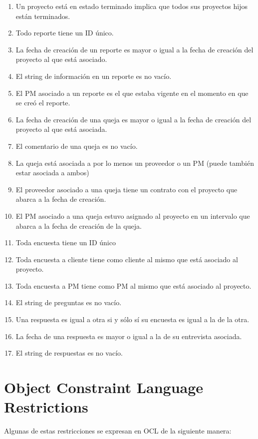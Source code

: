\documentclass{article}
\theoremstyle{definition}
\theoremstyle{remark}
\begin{document}
\begin{enumerate}
    \item Un proyecto está en estado terminado implica que todos sus proyectos hijos están terminados.
    \item Todo reporte tiene un ID único.
    \item La fecha de creación de un reporte es mayor o igual a la fecha de creación del proyecto al que está asociado.
    \item El string de información en un reporte es no vacío.
    \item El PM asociado a un reporte es el que estaba vigente en el momento en que se creó el reporte.
    \item La fecha de creación de una queja es mayor o igual a la fecha de creación del proyecto al que está asociada.
    \item El comentario de una queja es no vacío.
    \item La queja está asociada a por lo menos un proveedor o un PM (puede también estar asociada a ambos)
    \item El proveedor asociado a una queja tiene un contrato con el proyecto que abarca a la fecha de creación.
    \item El PM asociado a una queja estuvo asignado al proyecto en un intervalo que abarca a la fecha de creación de la queja.
    \item Toda encuesta tiene un ID único
    \item Toda encuesta a cliente tiene como cliente al mismo que está asociado al proyecto.
    \item Toda encuesta a PM tiene como PM al mismo que está asociado al proyecto.
    \item El string de preguntas es no vacío.
    \item Una respuesta es igual a otra si y sólo sí su encuesta es igual a la de la otra.
    \item La fecha de una respuesta es mayor o igual a la de su entrevista asociada.
    \item El string de respuestas es no vacío.
\end{enumerate}

\pagebreak

\section{Object Constraint Language Restrictions}

Algunas de estas restricciones se expresan en OCL de la siguiente manera:
\end{document}
